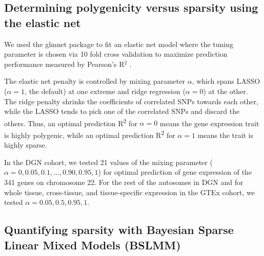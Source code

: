 \documentclass[10pt,letterpaper]{article}
\begin{document}
\subsection*{Determining polygenicity versus sparsity using the elastic
net}\label{determining-polygenicity-versus-sparsity-using-the-elastic-net}

We used the glmnet package to fit an elastic net model where the tuning parameter is chosen via 10 fold cross validation to maximize prediction performance measured by Pearson's R$^2$ \cite{Friedman_2010, Simon_2011}.


The elastic net penalty is controlled by mixing parameter \(\alpha\),
which spans LASSO (\(\alpha=1\), the default) \cite{Tibshirani_1996} at one extreme
and ridge regression (\(\alpha=0\)) \cite{Hoerl_1970} at the other. The ridge
penalty shrinks the coefficients of correlated SNPs towards each other,
while the LASSO tends to pick one of the correlated SNPs and discard the
others. Thus, an optimal prediction R\textsuperscript{2} for
\(\alpha=0\) means the gene expression trait is highly polygenic, while
an optimal prediction R\textsuperscript{2} for \(\alpha=1\) means the
trait is highly sparse. 

In the DGN cohort, we tested 21 values of the mixing parameter
(\(\alpha=0, 0.05, 0.1, ..., 0.90, 0.95, 1\)) for optimal prediction of
gene expression of the 341 genes on chromosome 22. For the rest of the
autosomes in DGN and for whole tissue, cross-tissue, and tissue-specific
expression in the GTEx cohort, we tested \(\alpha=0.05, 0.5, 0.95, 1\).

\subsection*{Quantifying sparsity with Bayesian Sparse Linear Mixed
Models
(BSLMM)}\label{quantifying-sparsity-with-bayesian-sparse-linear-mixed-models-bslmm}
\end{document}
